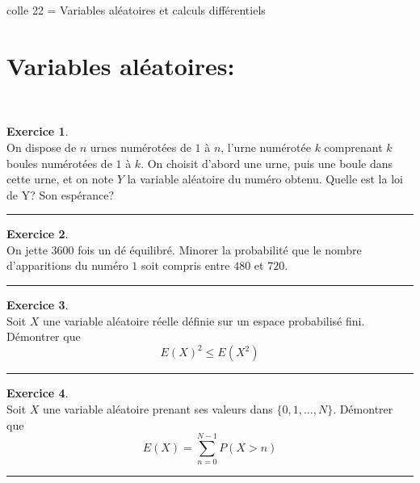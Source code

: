 \documentclass[a4paper,10pt]{article}
\theoremstyle{definition}
\theoremstyle{definition}
\newtheorem{exo}{Exercice}
\begin{document}
 	
	
	\begin{center}
		\Large \sc colle 22 = Variables aléatoires et calculs différentiels
	\end{center}




\section*{Variables aléatoires:}\hfill\\%
\begin{minipage}{1\linewidth}
	\begin{minipage}[t]{0.48\linewidth}
		\raggedright
		
			\begin{exo}\quad\\
			On dispose de $n$ urnes numérotées de $1$ à $n$, l'urne numérotée $k$ comprenant $k$ boules numérotées de $1$ à $k$. On choisit d'abord une urne, puis une boule dans cette urne, et on note $Y$ la variable aléatoire du numéro obtenu. Quelle est la loi de Y? Son espérance?
			
			\centering
			\rule{1\linewidth}{0.6pt}
		\end{exo}
	\begin{exo}\quad\\
		On jette $3600$ fois un dé équilibré. Minorer la probabilité que le nombre d'apparitions du numéro $1$ soit compris entre $480$ et $720$.
		
		\centering
		\rule{1\linewidth}{0.6pt}
	\end{exo}
	
	\begin{exo}\quad\\
		Soit $X$ une variable aléatoire réelle définie sur un espace probabilisé fini. Démontrer que $$E(X)^2\leq E(X^2)$$
		\centering
		\rule{1\linewidth}{0.6pt}
	\end{exo}
	
\begin{exo}\quad\\
	
	Soit $X$ une variable aléatoire prenant ses valeurs dans $\{0,1,...,N\}$. Démontrer que 
	$$E(X) = \sum_{n=0}^{N-1} P(X>n)$$
	
	\centering
	\rule{1\linewidth}{0.6pt}
\end{exo}
	



		
		

\end{minipage}
\end{minipage}
\end{document}
